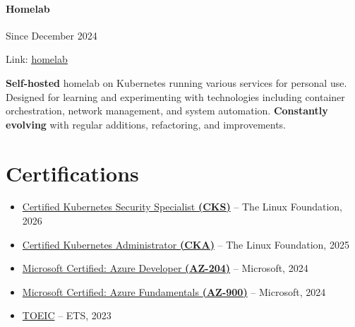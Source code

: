 \documentclass{article}
\begin{document}
\paragraph{Homelab} \hspace*{\fill}Since December 2024

Link: \href{https://issamsisbane.github.io/portfolio/en/blog/homelab---1---setup/}{\underline{homelab}}

\vspace{\baselineskip}

\textbf{Self-hosted} homelab on Kubernetes running various services for personal use. Designed for learning and experimenting with technologies including container orchestration, network management, and system automation. \textbf{Constantly evolving} with regular additions, refactoring, and improvements.

\vspace{\baselineskip}

\vspace{2ex}
\hrulefill

\section*{Certifications}
\begin{itemize}
  \item \href{https://www.credly.com/badges/313586a1-4d6b-4370-806a-c16ae2d5a650/public_url}{Certified Kubernetes Security Specialist \textbf{(CKS)}} – The Linux Foundation, 2026
  \item \href{https://www.credly.com/badges/0cbcbdda-468f-40c1-91a7-465114ff60cb/public_url}{Certified Kubernetes Administrator \textbf{(CKA)}} – The Linux Foundation, 2025
  \item \href{https://learn.microsoft.com/api/credentials/share/fr-fr/IssamSISBANE-4752/9BC1C0080C19DD38?sharingId=B40C0FD0BE50D583}{Microsoft Certified: Azure Developer \textbf{(AZ-204)}} – Microsoft, 2024
  \item \href{https://learn.microsoft.com/api/credentials/share/fr-fr/IssamSISBANE-4752/32A02BF61E6E5685?sharingId=B40C0FD0BE50D583}{Microsoft Certified: Azure Fundamentals \textbf{(AZ-900)}} – Microsoft, 2024
  \item \href{https://drive.google.com/file/d/1DXkxWty0u_Zw_BTz6_u9F2je5KRt1Ffd/view}{TOEIC} – ETS, 2023
\end{itemize}
\end{document}
